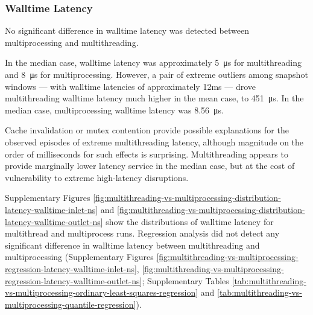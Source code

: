 \subsubsection{Walltime Latency}

No significant difference in walltime latency was detected between multiprocessing and multithreading.

In the median case, walltime latency was approximately \SI{5}{\micro\second} for multithreading and \SI{8}{\micro\second} for multiprocessing.
However, a pair of extreme outliers among snapshot windows --- with walltime latencies of approximately 12ms --- drove multithreading walltime latency much higher in the mean case, to \SI{451}{\micro\second}.
In the median case, multiprocessing walltime latency was \SI{8.56}{\micro\second}.

Cache invalidation or mutex contention provide possible explanations for the observed episodes of extreme multithreading latency, although magnitude on the order of milliseconds for such effects is surprising.
Multithreading appears to provide marginally lower latency service in the median case, but at the cost of vulnerability to extreme high-latency disruptions.

Supplementary Figures \ref{fig:multithreading-vs-multiprocessing-distribution-latency-walltime-inlet-ns} and \ref{fig:multithreading-vs-multiprocessing-distribution-latency-walltime-outlet-ns} show the distributions of walltime latency for multithread and multiprocess runs.
Regression analysis did not detect any significant difference in walltime latency between multithreading and multiprocessing (Supplementary Figures \ref{fig:multithreading-vs-multiprocessing-regression-latency-walltime-inlet-ns}, \ref{fig:multithreading-vs-multiprocessing-regression-latency-walltime-outlet-ns}; Supplementary Tables \ref{tab:multithreading-vs-multiprocessing-ordinary-least-squares-regression} and \ref{tab:multithreading-vs-multiprocessing-quantile-regression}).


